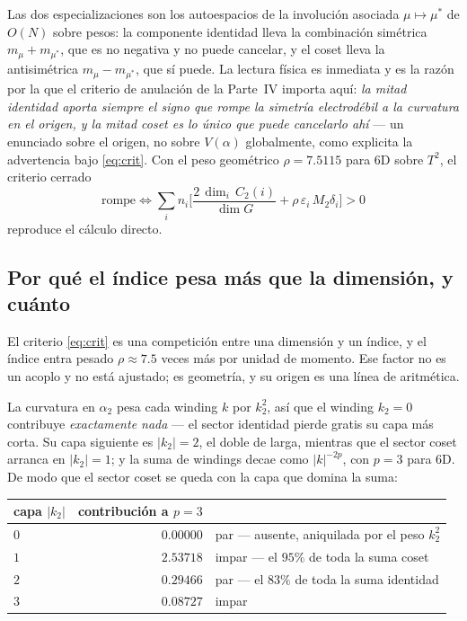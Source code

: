 \documentclass[11pt,a4paper]{article}
\begin{document}
Las dos especializaciones son los autoespacios de la involución asociada $\mu\mapsto\mu^*$ de $O(N)$
sobre pesos: la componente identidad lleva la combinación simétrica $m_\mu+m_{\mu^*}$, que es no
negativa y no puede cancelar, y el coset lleva la antisimétrica $m_\mu-m_{\mu^*}$, que sí puede. La
lectura física es inmediata y es la razón por la que el criterio de anulación de la Parte~IV importa
aquí: \emph{la mitad identidad aporta siempre el signo que rompe la simetría electrodébil a la
curvatura en el origen, y la mitad coset es lo único que puede cancelarlo ahí} --- un enunciado
sobre el origen, no sobre $V(\alpha)$ globalmente, como explicita la advertencia bajo
\eqref{eq:crit}. Con el peso geométrico $\rho=7.5115$ para 6D sobre $T^2$, el criterio
cerrado
\begin{equation}\label{eq:crit}
\text{rompe}\iff \sum_i n_i\Big[\frac{2\,\dim_i\,C_2(i)}{\dim G}+\rho\,\varepsilon_i\,M_2\delta_i\Big] > 0
\end{equation}
reproduce el cálculo directo.

\subsection*{Por qué el índice pesa más que la dimensión, y cuánto}

El criterio \eqref{eq:crit} es una competición entre una dimensión y un índice, y el índice entra
pesado $\rho\approx7.5$ veces más por unidad de momento. Ese factor no es un acoplo y no está
ajustado; es geometría, y su origen es una línea de aritmética.

La curvatura en $\alpha_2$ pesa cada winding $k$ por $k_2^2$, así que el winding $k_2=0$ contribuye
\emph{exactamente nada} --- el sector identidad pierde gratis su capa más corta. Su capa siguiente es
$|k_2|=2$, el doble de larga, mientras que el sector coset arranca en $|k_2|=1$; y la suma de windings
decae como $|k|^{-2p}$, con $p=3$ para 6D. De modo que el sector coset se queda con la capa que domina
la suma:

\begin{center}\small
{}
\begin{tabular}{lrl}
\toprule
\rowcolor{hdrblue!14}capa $|k_2|$ & contribución a $p=3$ & \\
\midrule
$0$ & $0.00000$ & par --- ausente, aniquilada por el peso $k_2^2$\\
$1$ & $2.53718$ & impar --- el $95\%$ de toda la suma coset\\
$2$ & $0.29466$ & par --- el $83\%$ de toda la suma identidad\\
$3$ & $0.08727$ & impar\\
\bottomrule
\end{tabular}
\end{center}
\end{document}
